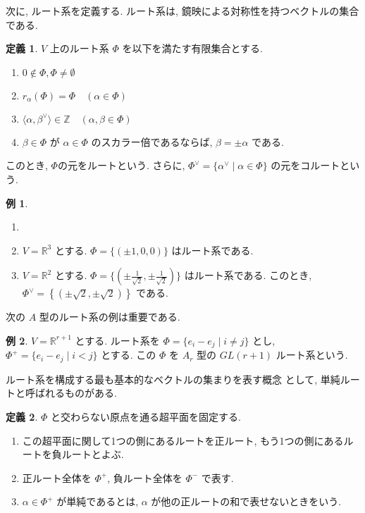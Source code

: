 \documentclass[
  a4paper, 
  12pt,
  ja=standard,
  xelatex,
  left=30truemm,
  right=30truemm,
  titlepage 
]{bxjsarticle}
\theoremstyle{definition}
\newtheorem{df}{定義}[section]
\newtheorem*{ex}{例}
\begin{document}
次に, ルート系を定義する.
ルート系は, 鏡映による対称性を持つベクトルの集合である.

\begin{df} 
  $V$ 上のルート系 $\Phi$ を以下を満たす有限集合とする.
  \begin{enumerate}
    \item $ 0 \notin \Phi , \Phi \neq \emptyset $
    \item $ r_\alpha (\Phi) = \Phi \quad ( \alpha \in \Phi )$
    \item $ \langle \alpha, \beta^{ \vee } \rangle \in \mathbb{Z} \quad ( \alpha, \beta \in \Phi )$
    \item $ \beta \in \Phi $ が $ \alpha \in \Phi $ のスカラー倍であるならば, $ \beta = \pm \alpha $ である.
  \end{enumerate}
  このとき, $ \Phi $の元をルートという.
  さらに, $ \Phi^{ \vee } = \{ \alpha^{ \vee } \mid \alpha \in \Phi \} $ の元をコルートという.
\end{df}

\begin{ex}
  \begin{enumerate}
    \item[]
    \item $V = \mathbb{R}^3$ とする.
    $\Phi = \{ (\pm1, 0, 0) \}$ はルート系である.
    \item $V = \mathbb{R}^2$ とする.
    $\Phi = \{ (\pm \frac{1}{\sqrt{2}}, \pm \frac{1}{\sqrt{2}}) \}$ はルート系である.
    このとき, $ \Phi^{\vee} = \left\{ (\pm \sqrt{2}, \pm \sqrt{2})\right\} $ である.
  \end{enumerate}
\end{ex}

次の $A$ 型のルート系の例は重要である.

\begin{ex}
  $V = \mathbb{R}^{r+1}$ とする.
  ルート系を $\Phi = \{ e_i - e_j \mid i \neq j \}$ とし, $\Phi^{+} = \{ e_i - e_j \mid i < j \}$ とする.
  この $\Phi$ を $A_r$ 型の $GL(r + 1)$ ルート系という.
\end{ex}

ルート系を構成する最も基本的なベクトルの集まりを表す概念
として, 単純ルートと呼ばれるものがある.

\begin{df}
  $\Phi$ と交わらない原点を通る超平面を固定する. 
  \begin{enumerate}
    \item この超平面に関して1つの側にあるルートを正ルート, もう1つの側にあるルートを負ルートとよぶ.
    \item 正ルート全体を $ \Phi^{+} $, 負ルート全体を $ \Phi^{-} $ で表す. 
    \item $\alpha \in \Phi^{+} $ が単純であるとは, $\alpha$ が他の正ルートの和で表せないときをいう.
  \end{enumerate}
\end{df}
\end{document}
